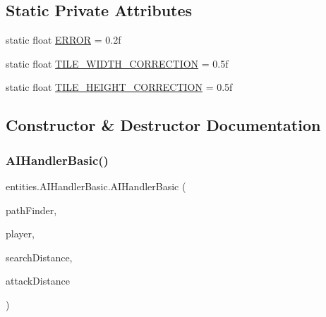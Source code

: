 \subsection*{Static Private Attributes}
\begin{DoxyCompactItemize}
\item 
static float \mbox{\hyperlink{classentities_1_1_a_i_handler_basic_adf8c3c47d56647bb7fa2f411dc5f7ae3}{E\+R\+R\+OR}} = 0.\+2f
\item 
static float \mbox{\hyperlink{classentities_1_1_a_i_handler_basic_a7f35345adb5b16156bfccceac3b59d28}{T\+I\+L\+E\+\_\+\+W\+I\+D\+T\+H\+\_\+\+C\+O\+R\+R\+E\+C\+T\+I\+ON}} = 0.\+5f
\item 
static float \mbox{\hyperlink{classentities_1_1_a_i_handler_basic_a70edbc0e1b2c38d9201dffee01ac0fa8}{T\+I\+L\+E\+\_\+\+H\+E\+I\+G\+H\+T\+\_\+\+C\+O\+R\+R\+E\+C\+T\+I\+ON}} = 0.\+5f
\end{DoxyCompactItemize}


\subsection{Constructor \& Destructor Documentation}
\mbox{\label{classentities_1_1_a_i_handler_basic_a5f3f185b43533fcbc1cd066ee1f7d16a}} 
\subsubsection{\texorpdfstring{A\+I\+Handler\+Basic()}{AIHandlerBasic()}}
{\footnotesize\ttfamily entities.\+A\+I\+Handler\+Basic.\+A\+I\+Handler\+Basic (\begin{DoxyParamCaption}\item[{\mbox{\hyperlink{classentities_1_1_path_finder}{Path\+Finder}}}]{path\+Finder,  }\item[{\mbox{\hyperlink{classentities_1_1_player}{Player}}}]{player,  }\item[{float}]{search\+Distance,  }\item[{float}]{attack\+Distance }\end{DoxyParamCaption})\hspace{0.3cm}{\ttfamily [inline]}}


